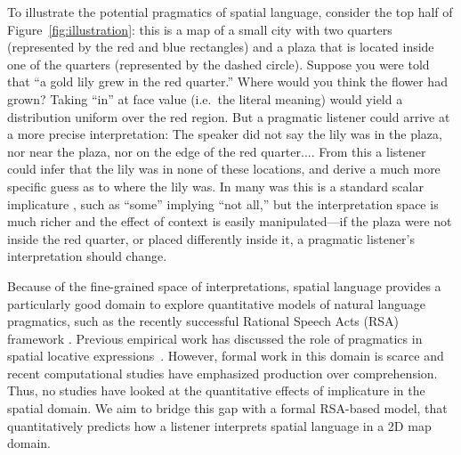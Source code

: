 \documentclass[10pt,letterpaper]{article}
\begin{document}
To illustrate the potential pragmatics of spatial language, consider the top half of Figure~\ref{fig:illustration}: this is a map of a small city with two quarters (represented by the red and blue rectangles) and a plaza that is located inside one of the quarters (represented by the dashed circle). 
Suppose you were told that ``a gold lily grew in the red quarter.'' Where would you think the flower had grown? 
Taking ``in'' at face value (i.e.~the literal meaning) would yield a distribution uniform over the red region.
But a pragmatic listener could arrive at a more precise interpretation: The speaker did not say the lily was in the plaza, nor near the plaza, nor on the edge of the red quarter.... From this a listener could infer that the lily was in none of these locations, and derive a much more specific guess as to where the lily was.
In many was this is a standard scalar implicature \cite{horn84}, such as ``some'' implying ``not all,'' but the interpretation space is much richer and the effect of context is easily manipulated---if the plaza were not inside the red quarter, or placed differently inside it, a pragmatic listener's interpretation should change.


Because of the fine-grained space of interpretations, spatial language provides a particularly good domain to explore quantitative models of natural language pragmatics, such as the recently successful Rational Speech Acts (RSA) framework \cite{frank2012predicting,ndg+ast:topics2013}.
Previous empirical work has discussed the role of pragmatics in spatial locative expressions~\cite{herskovits85,herskovits87}. 
However, formal work in this domain is scarce and recent computational studies have emphasized production \cite{carstensen14,golland10} over comprehension.
Thus, no studies have looked at the quantitative effects of implicature in the spatial domain.
 We aim to bridge this gap with a formal RSA-based model, that quantitatively predicts how a listener interprets spatial language in a 2D map domain. 
\end{document}
